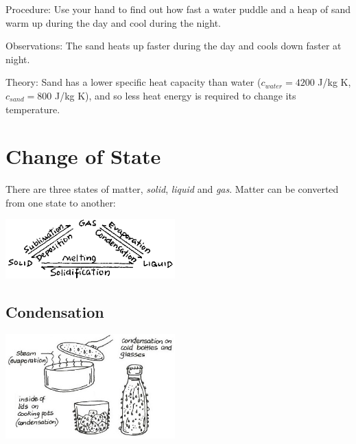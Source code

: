 \begin{multicols}{2}
\begin{description*}
\item[Procedure:]{Use your hand to find out how fast a water puddle and a heap of sand warm up during the day and cool during the night.}
\item[Observations:]{The sand heats up faster during the day and cools down faster at night.}
\item[Theory:]{Sand has a lower specific heat capacity than water ($c_{water} = 4200$ J/kg K, $c_{sand} = 800$ J/kg K), and so less heat energy is required to change its temperature.}
\end{description*}


\section*{Change of State}

There are three states of matter, \emph{solid}, \emph{liquid} and \emph{gas}. Matter can be converted from one state to another:

\begin{center}
\includegraphics[width=0.49\textwidth]{./img/source/change-of-state.png}
\end{center}


\subsection{Condensation}

\begin{center}
\includegraphics[width=0.49\textwidth]{./img/vso/condensation.jpg}
\end{center}


\end{multicols}
